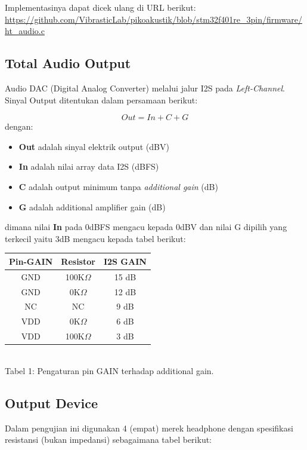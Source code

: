 \documentclass[12pt,]{article}
\begin{document}
	Implementasinya dapat dicek ulang di URL berikut:\\
	\url{https://github.com/VibrasticLab/pikoakustik/blob/stm32f401re_3pin/firmware/ht_audio.c}
	
	\subsection{Total Audio Output}
	
	Audio DAC (Digital Analog Converter) melalui jalur I2S pada \textit{Left-Channel}.
	Sinyal Output ditentukan dalam persamaan berikut\cite{Maxim}:
	
	\[Out = In + C + G\] dengan:
	
	\begin{itemize}
		\item \textbf{Out} adalah sinyal elektrik output (dBV)
		\item \textbf{In} adalah nilai array data I2S (dBFS)
		\item \textbf{C} adalah output minimum tanpa \textit{additional gain} (dB)
		\item \textbf{G} adalah additional amplifier gain (dB) 
	\end{itemize}

	dimana nilai \textbf{In} pada 0dBFS mengacu kepada 0dBV\cite{Maxim} dan nilai G dipilih yang terkecil yaitu 3dB mengacu kepada tabel berikut\cite{Maxim}:
	
	\begin{center}
		\begin{tabular}{ |c|c|c| } 
			\hline
			Pin-GAIN & Resistor & I2S GAIN \\ 
			\hline
			GND & 100K$\Omega$ & 15 dB \\ 
			GND & 0K$\Omega$ & 12 dB \\ 
			NC & NC & 9 dB \\ 
			VDD & 0K$\Omega$ & 6 dB \\ 
			VDD & 100K$\Omega$ & 3 dB \\ 
			\hline
		\end{tabular}\\
		\hfill \break
		Tabel 1: Pengaturan pin GAIN terhadap additional gain.
	\end{center}

	\newpage
	\subsection{Output Device}
	
	Dalam pengujian ini digunakan 4 (empat) merek headphone dengan spesifikasi resistansi (bukan impedansi) sebagaimana tabel berikut:
	
\end{document}
